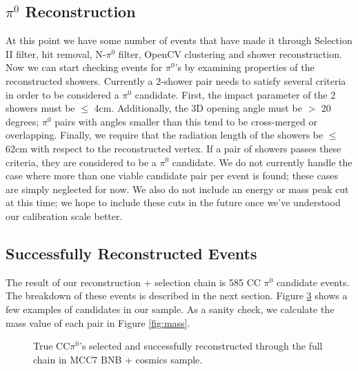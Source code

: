 \documentclass[12pt]{article}
\begin{document}
\subsection{$\pi^0$ Reconstruction}
\label{sec:pi0reco}
At this point we have some number of events that have made it through Selection II filter, hit removal, N-$\pi^0$ filter, OpenCV clustering and shower reconstruction. Now we can start checking events for $\pi^0$'s by examining properties of the reconstructed showers.  Currently a 2-shower pair needs to satisfy several criteria in order to be considered a $\pi^0$ candidate. First, the impact parameter of the 2 showers must be $\leq$ 4cm.  Additionally, the 3D opening angle must be $>$ 20 degrees; $\pi^0$ pairs with angles smaller than this tend to be cross-merged or overlapping. Finally, we require that the radiation length of the showers be $\leq$ 62cm with respect to the reconstructed vertex. If a pair of showers passes these criteria, they are considered to be a $\pi^0$ candidate. We do not currently handle the case where more than one viable candidate pair per event is found; these cases are simply neglected for now. We also do not include an energy or mass peak cut at this time; we hope to include these cuts in the future once we've understood our calibration scale better.

\subsection{Successfully Reconstructed Events}
The result of our reconstruction + selection chain is 585 CC $\pi^0$ candidate events. The breakdown of these events is described in the next section. Figure \ref{fig:ex2} shows a few examples of candidates in our sample. As a sanity check, we calculate the mass value of each pair in Figure \ref{fig:mass}. 

\begin{figure}[h!]
\centering
{}
\hspace{1 mm}
\label{fig:ex0}
\end{figure}
\begin{figure}[h!]
\centering
{}
\hspace{1 mm}
\hspace{1 mm}
\label{fig:ex2}
\end{figure}
\begin{figure}[h!]
\centering
{}
\hspace{1 mm}
\caption{True CC$\pi^0$'s selected and successfully reconstructed through the full chain in MCC7 BNB + cosmics sample. }
\label{fig:ex2}
\end{figure}
\end{document}
